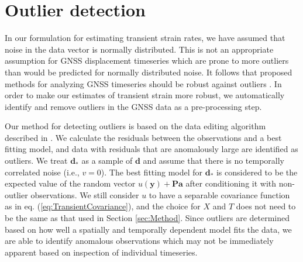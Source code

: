 \documentclass[10pt,letter]{article}
\begin{document}
\section{Outlier detection}\label{sec:Outlier}
In our formulation for estimating transient strain rates, we have assumed that noise in the data vector is normally distributed. This is not an appropriate assumption for GNSS displacement timeseries which are prone to more outliers than would be predicted for normally distributed noise. It follows that proposed methods for analyzing GNSS timeseries should be robust against outliers \citep[e.g.,][]{Blewitt2016}. In order to make our estimates of transient strain more robust, we automatically identify and remove outliers in the GNSS data as a pre-processing step.

Our method for detecting outliers is based on the data editing algorithm described in \citet{Gibbs2011}. We calculate the residuals between the observations and a best fitting model, and data with residuals that are anomalously large are identified as outliers. We treat $\bm{d}_*$ as a sample of $\bm{d}$ and assume that there is no temporally correlated noise (i.e., $v = 0$).  The best fitting model for $\bm{d}_*$ is considered to be the expected value of the random vector $u(\bm{y}) + \bm{P}\bm{a}$ after conditioning it with non-outlier observations.  We still consider $u$ to have a separable covariance function as in eq. (\ref{eq:TransientCovariance}), and the choice for $X$ and $T$ does not need to be the same as that used in Section \ref{sec:Method}. Since outliers are determined based on how well a spatially and temporally dependent model fits the data, we are able to identify anomalous observations which may not be immediately apparent based on inspection of individual timeseries. 
\end{document}
